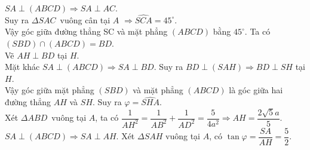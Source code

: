 \begin{ex}
{\begin{itemchoice}
    $SA\perp\left(ABCD\right)\Rightarrow SA\perp AC$.\\
   Suy ra $\Delta SAC\,$ vuông cân tại  $A$ $\Rightarrow\widehat{SCA}=45^\circ$.\\
   Vậy góc giữa đường thẳng SC và mặt phẳng  $\left(ABCD\right)$ bằng $45^\circ$.
   \itemch Ta có  $\left(SBD\right)\cap\left(ABCD\right)=BD$.\\
   Vẽ  $AH\perp BD$ tại $H$.\\
   Mặt  khác $SA\perp\left(ABCD\right)\Rightarrow SA\perp BD$. Suy ra $BD\perp\left(SAH\right)\Rightarrow BD\perp SH$ tại $H$.\\
   Vậy  góc giữa mặt phẳng $\left(SBD\right)$ và mặt phẳng $\left(ABCD\right)$ là góc giữa hai đường thẳng $AH$ và $SH$. Suy ra $\varphi=\widehat{SHA}$.\\
    Xét $\Delta ABD\,$ vuông tại $A$, ta có $\dfrac{1}{A{H^2}}=\dfrac{1}{A{B^2}}+\dfrac{1}{A{D^2}}=\dfrac{5}{4a^2}\Rightarrow AH=\dfrac{2\sqrt 5a}{5}$.\\
   $SA\perp\left(ABCD\right)\Rightarrow SA\perp AH$. Xét $\Delta  SAH$ vuông tại $A$, có $\tan\varphi=\dfrac{SA}{AH}=\dfrac{5}{2}$.
  \end{itemchoice}
  }
\end{ex}

